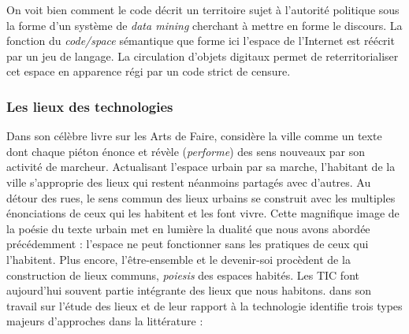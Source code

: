 On voit bien comment le code décrit un territoire sujet à l’autorité politique sous la forme d’un système de \textit{data mining} cherchant à mettre en forme le discours. La fonction du \textit{code/space} sémantique que forme ici l’espace de l’Internet est réécrit par un jeu de langage. La circulation d’objets digitaux permet de reterritorialiser cet espace en apparence régi par un code strict de censure. 

\subsubsection{Les lieux des technologies}
Dans son célèbre livre sur les Arts de Faire, \cite{Certeau1980} considère la ville comme un texte dont chaque piéton énonce et révèle (\textit{performe}) des sens nouveaux par son activité de marcheur. Actualisant l’espace urbain par sa marche, l’habitant de la ville s’approprie des lieux qui restent néanmoins partagés avec d’autres. Au détour des rues, le sens commun des lieux urbains se construit avec les multiples énonciations de ceux qui les habitent et les font vivre. Cette magnifique image de la poésie du texte urbain met en lumière la dualité que nous avons abordée précédemment : l’espace ne peut fonctionner sans les pratiques de ceux qui l’habitent. Plus encore, l’être-ensemble et le devenir-soi procèdent de la construction de lieux communs, \textit{poiesis} des espaces habités. Les TIC font aujourd’hui souvent partie intégrante des lieux que nous habitons. \cite{Graham1998} dans son travail sur l’étude des lieux et de leur rapport à la technologie identifie trois types majeurs d’approches dans la littérature :


